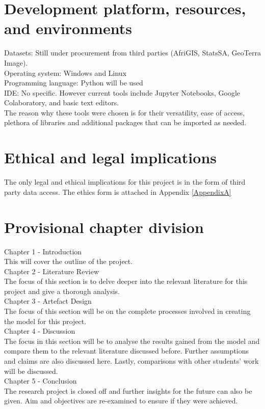 \section{Development platform, resources, and environments}
Datasets: Still under procurement from third parties (AfriGIS, StatsSA, GeoTerra Image).\\
Operating system: Windows and Linux\\
Programming language: Python will be used\\
IDE: No specific. However current tools include Jupyter Notebooks, Google Colaboratory, and basic text editors.\\
The reason why these tools were chosen is for their versatility, ease of access, plethora of libraries and additional packages that can be imported as needed. 
\section{Ethical and legal implications}
The only legal and ethical implications for this project is in the form of third party data access. The ethics form is attached in Appendix \ref{AppendixA}
\section{Provisional chapter division}
Chapter 1 - Introduction\\
This will cover the outline of the project.\\
Chapter 2 - Literature Review\\
The focus of this section is to delve deeper into the relevant literature for this project and give a thorough analysis.\\
Chapter 3 - Artefact Design\\
The focus of this section will be on the complete processes involved in creating the model for this project.\\
Chapter 4 - Discussion\\
The focus in this section will be to analyse the results gained from the model and compare them to the relevant literature discussed before. Further assumptions and claims are also discussed here. Lastly, comparisons with other students' work will be discussed.\\
Chapter 5 - Conclusion\\
The research project is closed off and further insights for the future can also be given. Aim and objectives are re-examined to ensure if they were achieved.
